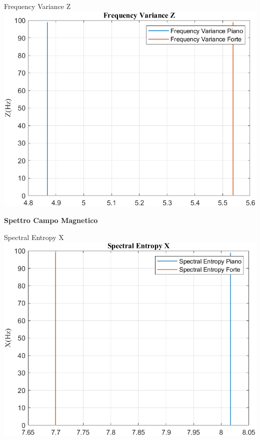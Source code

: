 	\begin{frame}{{Frequency Variance Z}}
		\centering\includegraphics[height=.8\textheight]{figure/Mag/Trasformata/Frequency VarianceZ}
	\end{frame}
	
	\begin{frame}
		\color{blue}\centering\huge{\textbf{Spettro Campo Magnetico}}
	\end{frame}
	
	
	
	\begin{frame}{{Spectral Entropy X}}
		\centering\includegraphics[height=.8\textheight]{figure/Mag/Trasformata/Spectral EntropyX}
	\end{frame}
	
